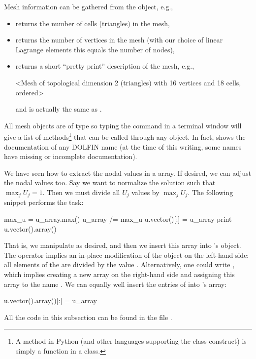 Mesh information can be gathered from the  object, e.g.,
\begin{itemize}
\item {} returns the number of cells (triangles) in
the mesh,
\item {} returns the number of vertices
in the mesh (with our choice of linear Lagrange elements this equals
the number of nodes),
\item {} returns
a short ``pretty print''
description of the mesh, e.g.,
\begin{progoutput}
<Mesh of topological dimension 2 (triangles) with
16 vertices and 18 cells, ordered>
\end{progoutput}
\noindent
and  is actually the same as .
\end{itemize}
All mesh objects are of type  so typing the command
 in a terminal window will
give a list of methods\footnote{A method in Python (and other
  languages supporting the class construct) is simply a function in a
  class.}  that can be called through any  object. In fact,
 shows the documentation of any DOLFIN name
 (at the time of this writing, some names have missing or
incomplete documentation).

We have seen how to extract the nodal values in a
 array.  If desired, we can
adjust the nodal values too. Say we want to normalize the solution
such that $\max_j U_j = 1$. Then we must divide all $U_j$ values by
$\max_j U_j$. The following snippet performs the task:
\begin{python}
max_u = u_array.max()
u_array /= max_u
u.vector()[:] = u_array
print u.vector().array()
\end{python}
That is, we manipulate  as desired, and then we insert
this array into 's  object.  The \emp{/=} operator
implies an in-place modification of the object on the left-hand side:
all elements of the  are divided by the value
.  Alternatively, one could write , which implies creating a new array on the
right-hand side and assigning this array to the name .
We can equally well insert the entries of  into
's  array:
\begin{python}
u.vector().array()[:] = u_array
\end{python}
All the code in this subsection can be found in the file .


